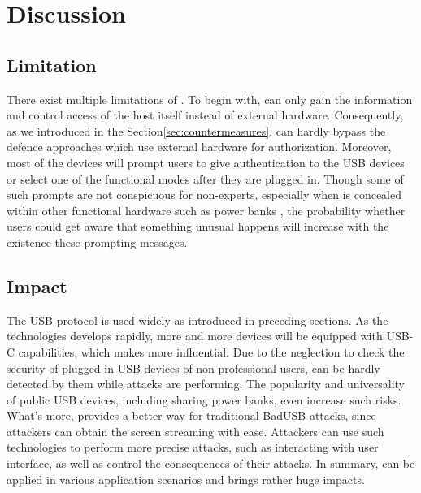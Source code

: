 \section{Discussion}
\label{sec:discussion}

\subsection{Limitation}
There exist multiple limitations of \tool.
To begin with, \tool can only gain the information and control access of the host itself instead of external hardware.
Consequently, as we introduced in the Section\ref{sec:countermeasures}, \tool can hardly bypass the defence approaches which use external hardware for authorization.
Moreover, most of the devices will prompt users to give authentication to the USB devices or select one of the functional modes after they are plugged in.
Though some of such prompts are not conspicuous for non-experts, especially when \tool is concealed within other functional hardware such as power banks , the probability whether users could get aware that something unusual happens will increase with the existence these prompting messages.

\subsection{Impact}
The USB protocol is used widely as introduced in preceding sections.
As the technologies develops rapidly, more and more devices will be equipped with USB-C capabilities, which makes \tool more influential.
Due to the neglection to check the security of plugged-in USB devices of non-professional users, \tool can be hardly detected by them while attacks are performing.
The popularity and universality of public USB devices, including sharing power banks, even increase such risks.
What's more, \tool provides a better way for traditional BadUSB attacks, since attackers can obtain the screen streaming with ease.
Attackers can use such technologies to perform more precise attacks, such as interacting with user interface, as well as control the consequences of their attacks.
In summary, \tool can be applied in various application scenarios and brings rather huge impacts.